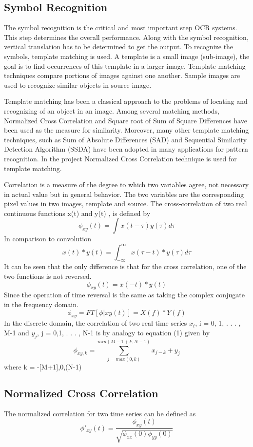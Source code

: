 \documentclass[journal]{IEEEtran}
\begin{document}
\subsection{Symbol Recognition}
The symbol recognition is the critical and most important step OCR systems. This step determines the overall performance. Along with the symbol recognition, vertical translation has to be determined to get the output. To recognize the symbols, template matching is used. A template
is a small image (sub-image), the goal is to find occurrences of this template in a larger image. Template matching techniques compare portions of images against one another. Sample images are used to recognize similar objects in source image.\par
Template matching has been a classical approach to the problems of locating and recognizing of an object in an image. Among several matching methods, Normalized Cross Correlation and Square root of Sum of Square Differences have been used as the measure for similarity. Moreover, many other template matching techniques, such as Sum of Absolute Differences (SAD) and Sequential Similarity Detection Algorithm (SSDA) have been adopted in many applications for pattern recognition. In the project Normalized Cross Correlation technique is used for template matching. \par
Correlation is a measure of the degree to which two variables agree, not necessary in actual value but in general behavior. The two variables are the corresponding pixel values in two images, template and source. The cross-correlation of two real continuous functions x(t) and y(t) , is defined by
\[ \phi _{xy} (t) = \int x(t - \tau  )y(\tau)d \tau \]
In comparison to convolution
\[ x(t)*y(t) = \int _{- \infty }^{ \infty } x( \tau - t)*y(\tau)d \tau \]
It can be seen that the only difference is that for the cross correlation, one of the two functions is not reversed.
\[ \phi _{xy} (t) = x(-t)*y(t) \]
Since the operation of time reversal is the same as taking the complex conjugate in the frequency domain.
\[ \phi_{xy} = FT[\phi|xy(t)] = X(f)*Y(f) \]
In the discrete domain, the correlation of two real time series $x_i$, i = 0, 1, . . . , M-1 and $y_j$, j = 0,1, . . . , N-1 is by analogy to equation (1) given by
\[ \phi _{xy, k} = \sum_{j = max(0,k)}^{min(M-1+k, N-1)} x_{j-k} + y_{j} \]
where k = -[M+1],0,(N-1)

\subsection{Normalized Cross Correlation}
The normalized correlation for two time series can be defined as
\[ \phi' _{xy}(t) = \frac{ \phi _{xy}(t) }{ \sqrt{ \phi _{xx}(0)\phi _{yy}(0) } } \]
\end{document}
